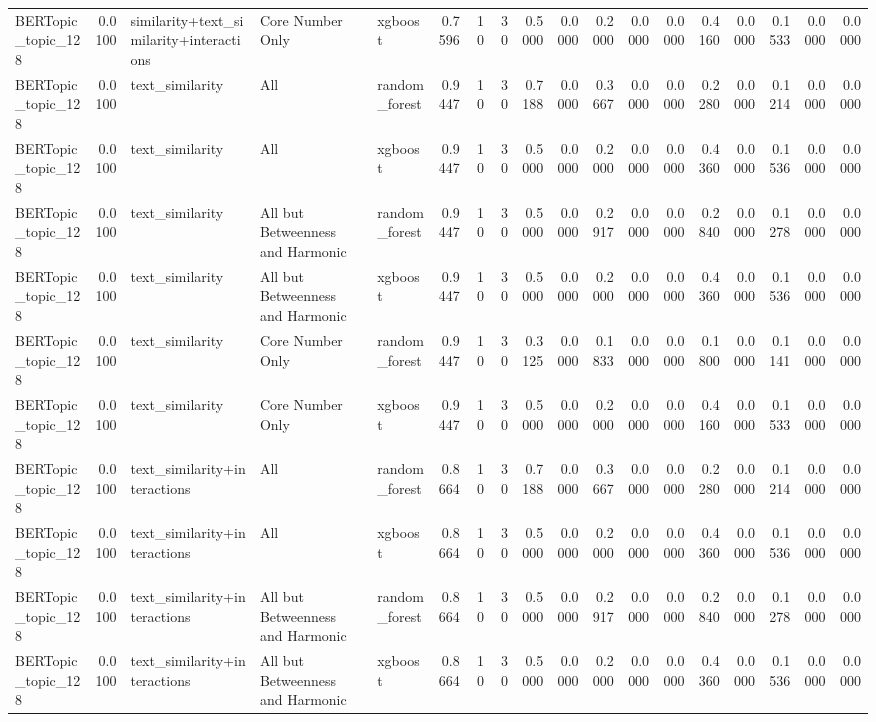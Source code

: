 \begin{tabular}{lrlllrrrrrrrrrrrrr}
BERTopic_topic_128 & 0.0100 & similarity+text_similarity+interactions & Core Number Only & xgboost & 0.7596 & 10 & 30 & 0.5000 & 0.0000 & 0.2000 & 0.0000 & 0.0000 & 0.4160 & 0.0000 & 0.1533 & 0.0000 & 0.0000 \\
BERTopic_topic_128 & 0.0100 & text_similarity & All & random_forest & 0.9447 & 10 & 30 & 0.7188 & 0.0000 & 0.3667 & 0.0000 & 0.0000 & 0.2280 & 0.0000 & 0.1214 & 0.0000 & 0.0000 \\
BERTopic_topic_128 & 0.0100 & text_similarity & All & xgboost & 0.9447 & 10 & 30 & 0.5000 & 0.0000 & 0.2000 & 0.0000 & 0.0000 & 0.4360 & 0.0000 & 0.1536 & 0.0000 & 0.0000 \\
BERTopic_topic_128 & 0.0100 & text_similarity & All but Betweenness and Harmonic & random_forest & 0.9447 & 10 & 30 & 0.5000 & 0.0000 & 0.2917 & 0.0000 & 0.0000 & 0.2840 & 0.0000 & 0.1278 & 0.0000 & 0.0000 \\
BERTopic_topic_128 & 0.0100 & text_similarity & All but Betweenness and Harmonic & xgboost & 0.9447 & 10 & 30 & 0.5000 & 0.0000 & 0.2000 & 0.0000 & 0.0000 & 0.4360 & 0.0000 & 0.1536 & 0.0000 & 0.0000 \\
BERTopic_topic_128 & 0.0100 & text_similarity & Core Number Only & random_forest & 0.9447 & 10 & 30 & 0.3125 & 0.0000 & 0.1833 & 0.0000 & 0.0000 & 0.1800 & 0.0000 & 0.1141 & 0.0000 & 0.0000 \\
BERTopic_topic_128 & 0.0100 & text_similarity & Core Number Only & xgboost & 0.9447 & 10 & 30 & 0.5000 & 0.0000 & 0.2000 & 0.0000 & 0.0000 & 0.4160 & 0.0000 & 0.1533 & 0.0000 & 0.0000 \\
BERTopic_topic_128 & 0.0100 & text_similarity+interactions & All & random_forest & 0.8664 & 10 & 30 & 0.7188 & 0.0000 & 0.3667 & 0.0000 & 0.0000 & 0.2280 & 0.0000 & 0.1214 & 0.0000 & 0.0000 \\
BERTopic_topic_128 & 0.0100 & text_similarity+interactions & All & xgboost & 0.8664 & 10 & 30 & 0.5000 & 0.0000 & 0.2000 & 0.0000 & 0.0000 & 0.4360 & 0.0000 & 0.1536 & 0.0000 & 0.0000 \\
BERTopic_topic_128 & 0.0100 & text_similarity+interactions & All but Betweenness and Harmonic & random_forest & 0.8664 & 10 & 30 & 0.5000 & 0.0000 & 0.2917 & 0.0000 & 0.0000 & 0.2840 & 0.0000 & 0.1278 & 0.0000 & 0.0000 \\
BERTopic_topic_128 & 0.0100 & text_similarity+interactions & All but Betweenness and Harmonic & xgboost & 0.8664 & 10 & 30 & 0.5000 & 0.0000 & 0.2000 & 0.0000 & 0.0000 & 0.4360 & 0.0000 & 0.1536 & 0.0000 & 0.0000 \\

\end{tabular}
